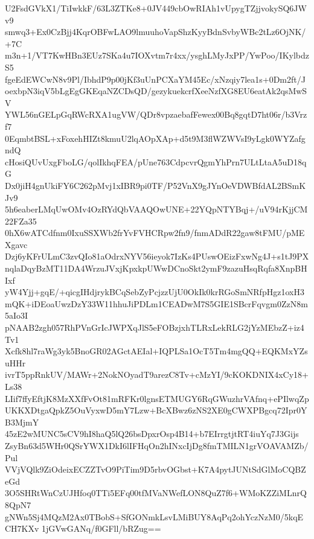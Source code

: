 U2FsdGVkX1/TiIwkkF/63L3ZTKe8+0JV449cbOwRIAh1vUpygTZjjvokySQ6JWv9
smwq3+Ex0CzBjj4KqrOBFwLAO9lmuuhoVapShzKyyBdnSvbyWBc2tLz6OjNK/+7C
m3n+1/VT7KwHBn3EUz7SKa4u7IOXvtm7r4xx/ysghLMyJxPP/YwPoo/IKylbdzS5
fgeEdEWCwN8v9Pl/IbhdP9p00jKf3uUnPCXaYM45Ec/xNzqiy7lea1s+0Dm2ft/J
oexbpN3iqV5bLgEgGKEqaNZCDsQD/gezykuekcrfXeeNzfXG8EU6eatAk2qsMwSV
YWL56nGELpGqRWcRXA1ugVW/QDr8vpzaebafFewex00Bq8gqtD7ht06r/b3Vrzf7
0EqmbtBSL+xFoxehHIZt8kmuU2lqAOpXAp+d5t9M3flWZWVsI9yLgk0WYZafgndQ
cHosiQUvUxgFboLG/qolIkhqFEA/pUne763CdpcvrQgmYhPrn7ULtLtaA5uD18qG
Dx0jiH4gnUkiFY6C262pMvj1xIBR9pi0TF/P52VnX9gJYnOeVDWBfdAL2BSmKJv9
5h6eaberLMqUwOMv4OzRYdQbVAAQOwUNE+22YQpNTYBqj+/uV94rKjjCM22FZa35
0hX6wATCdfnm0IxuSSXWb2frYvFVHCRpw2fn9/fnmADdR22gaw8tFMU/pMEXgavc
Dzj6yKFrULmC3zvQIo81aOdrxNYV56ieyok7IzKs4PUswOEizFxwNg4J+s1tJ9PX
nqlaDqyBzMT11DA4WrzuJVxjKpxkpUWwDCnoSkt2ymF9zazuHsqRqfa8XnpBHIxf
yW4Yjj+gqE/+qicgIHdjrykBCqSebZyPcjzzUjU0OkIk0krRGoSmNRfpHgz1oxH3
mQK+iDEoaUwzDzY33W11hhuJiPDLm1CEADwM7S5GIE1SBcrFqvgm0ZzN8m5aIo3I
pNAAB2zgh057RhPVnGrIcJWPXqJlS5eFOBzjxhTLRxLekRLG2jYzMEbzZ+iz4Tv1
Xcfk8hl7raWg3yk5BnoGR02AGctAEIal+IQPLSa1OcT5Tm4mgQQ+EQKMxYZsuHHr
ivrT5ppRnkUV/MAWr+2NokNOyadT9arezC8Tv+cMzYI/9cKOKDNIX4xCy18+Ls38
LIif7ffyEftjK8MzXXfFvOt81mRFKr0lgnsETMUGY6RqGWuzhrVAfnq+ePIlwqZp
UKKXDtgaQpkZ5OuVyxwD5mY7Lzw+BcXBwz6zNS2XE0gCWXPBgcq72Ipr0YB3MjmY
45zE2wMUNC5sCV9hI8haQ5lQ26bsDpxrOsp4B14+b7EIrrgtjtRT4iuYq7J3Gijs
ZsyBn63d5WHr0QSrYWX1DkI6lIFHqOn2hINxcIjDg8fmTMILN1grVOAVAMZb/Pul
VVjVQlk9ZiOdeixECZZTvO9PiTim9D5rbvOGbst+K7A4pytJUNtSdGlMoCQBZeGd
3O5SHRtWnCzUJHfoq0TTi5EFq00tfMVaNWefLON8QuZ7f6+WMoKZZiMLnrQ8QpN7
gNWn5Sj4MQzM2Ax0TBobS+SfGONmkLsvLMiBUY8AqPq2ohYczNzM0/5kqECH7KXv
1jGVwGANq/f0GFll/bRZug==
